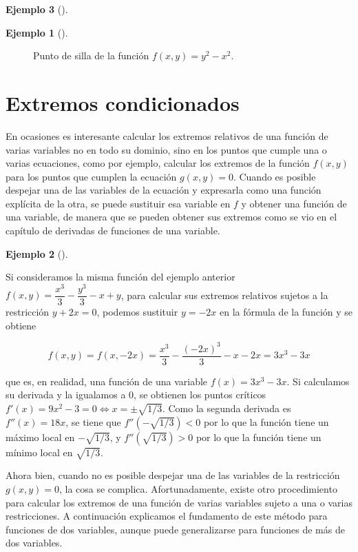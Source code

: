 \documentclass[
  a4paper,
]{scrreport}
\theoremstyle{definition}
\newtheorem{example}{Ejemplo}[chapter]
\theoremstyle{plain}
\theoremstyle{definition}
\theoremstyle{definition}
\theoremstyle{plain}
\theoremstyle{plain}
\theoremstyle{remark}
\begin{document}
\begin{example}[]
\begin{example}[]
\begin{figure}[H]
{}

\caption{Punto de silla de la función \(f(x,y)=y^2-x^2\).}

\end{figure}%

\end{example}

\section{Extremos condicionados}\label{extremos-condicionados}

En ocasiones es interesante calcular los extremos relativos de una
función de varias variables no en todo su dominio, sino en los puntos
que cumple una o varias ecuaciones, como por ejemplo, calcular los
extremos de la función \(f(x,y)\) para los puntos que cumplen la
ecuación \(g(x,y)=0\). Cuando es posible despejar una de las variables
de la ecuación y expresarla como una función explícita de la otra, se
puede sustituir esa variable en \(f\) y obtener una función de una
variable, de manera que se pueden obtener sus extremos como se vio en el
capítulo de derivadas de funciones de una variable.

\begin{example}[]\protect\hypertarget{exm-extremos-condicionados}{}\label{exm-extremos-condicionados}

Si consideramos la misma función del ejemplo anterior
\(f(x,y)=\dfrac{x^3}{3}-\dfrac{y^3}{3}-x+y\), para calcular sus extremos
relativos sujetos a la restricción \(y+2x=0\), podemos sustituir
\(y=-2x\) en la fórmula de la función y se obtiene

\[
f(x,y) 
= f(x,-2x) 
= \frac{x^3}{3}-\frac{(-2x)^3}{3}-x-2x 
= 3x^3-3x 
\]

que es, en realidad, una función de una variable \(f(x)=3x^3-3x\). Si
calculamos su derivada y la igualamos a 0, se obtienen los puntos
críticos \(f'(x) = 9x^2-3 = 0 \Leftrightarrow x=\pm\sqrt{1/3}\). Como la
segunda derivada es \(f''(x) = 18x\), se tiene que
\(f''(-\sqrt{1/3})<0\) por lo que la función tiene un máximo local en
\(-\sqrt{1/3}\), y \(f''(\sqrt{1/3})>0\) por lo que la función tiene un
mínimo local en \(\sqrt{1/3}\).

\end{example}

Ahora bien, cuando no es posible despejar una de las variables de la
restricción \(g(x,y)=0\), la cosa se complica. Afortunadamente, existe
otro procedimiento para calcular los extremos de una función de varias
variables sujeto a una o varias restricciones. A continuación explicamos
el fundamento de este método para funciones de dos variables, aunque
puede generalizarse para funciones de más de dos variables.


\end{example}
\end{document}
